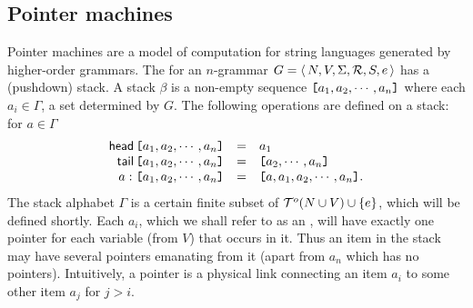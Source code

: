 \subsection{Pointer machines}
Pointer machines are a model of computation for string languages
generated by higher-order grammars. The 
for an $n$-grammar $G = \langle\,{N, V, \Sigma, {\cal R}, S, e}\,\rangle$ has
a (pushdown) stack.  A stack $\beta$ is a non-empty sequence
$\hbox{\tt [}{a_1, a_2, \cdots, a_n}\hbox{\tt ]}$ where each $a_i \in \Gamma$, a
set determined by $G$. The following operations are defined on a
stack: for $a \in \Gamma$
\[\begin{array}{rll}
{\sf head}\,{\hbox{\tt [}{a_1, a_2, \cdots, a_n}\hbox{\tt ]}} & = & a_1 \\
{\sf tail}\,{\hbox{\tt [}{a_1, a_2, \cdots, a_n}\hbox{\tt ]}} & = & \hbox{\tt [}{a_2, \cdots, a_n}\hbox{\tt ]}\\
a : \hbox{\tt [}{a_1, a_2, \cdots, a_n}\hbox{\tt ]} & = & \hbox{\tt [}{a, a_1, a_2, \cdots, a_n}\hbox{\tt ]}.
\end{array}\]
The stack alphabet $\Gamma$ is a certain finite subset of
${\cal T}^{o}(N \cup V) \cup \{e\}$, which will be defined shortly.
Each $a_i$, which we shall refer to as an , will
have exactly one pointer for each variable (from $V$) that occurs
in it. Thus an item in the stack may have several pointers
emanating from it (apart from $a_n$ which has no pointers).
Intuitively, a pointer is a physical link connecting an item $a_i$
to some other item $a_j$ for $j > i$.


